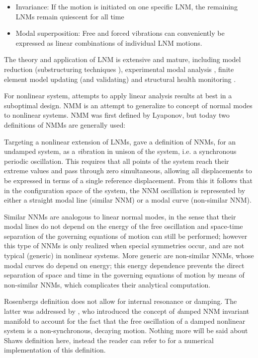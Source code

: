 \begin{itemize}
\item Invariance: If the motion is initiated on one specific LNM, the remaining
  LNMs remain quiescent for all time
\item Modal superposition: Free and forced vibrations can conveniently be
  expressed as linear combinations of individual LNM motions.
\end{itemize}

The theory and application of LNM is extensive and mature, including model
reduction (substructuring techniques \citep{craig1968a}), experimental modal
analysis \citep{ewins2000a}, finite element model updating (and
validating)\citep{friswell1995a} and structural health monitoring
\citet{doebling1996damage}.



For nonlinear system, attempts to apply linear analysis results at best in a
suboptimal design. NMM is an attempt to generalize to concept of normal modes to
nonlinear systems. NMM was first defined by Lyaponov, but today two definitions
of NMMs are generally used:

Targeting a nonlinear extension of LNMs, \citep{rosenberg1966a} gave a
definition of NNMs, for an undamped system, as a {\textit vibration in unison of the
  system}, i.e. a synchronous periodic oscillation. This requires that all
points of the system reach their extreme values and pass through zero
simultaneous, allowing all displacements to be expressed in terms of a single
reference displacement.
From this it follows that in the configuration space of the system, the NNM
oscillation is represented by either a straight modal line (similar NNM) or a
modal curve (non-similar NNM).

Similar NNMs are analogous to linear normal modes, in the sense that their modal
lines do not depend on the energy of the free oscillation and space-time
separation of the governing equations of motion can still be performed; however
this type of NNMs is only realized when special symmetries occur, and are not
typical (generic) in nonlinear systems. More generic are non-similar NNMs, whose
modal curves do depend on energy; this energy dependence prevents the direct
separation of space and time in the governing equations of motion by means of
non-similar NNMs, which complicates their analytical computation.


Rosenbergs definition does not allow for internal resonance or damping.  The
latter was addressed by \citep{shaw1993a}, who introduced the concept of {\textit
  damped NNM invariant manifold} to account for the fact that the free
oscillation of a damped nonlinear system is a non-synchronous, decaying motion.
Nothing more will be said about Shaws definition here, instead the reader can
refer to \citep{renson2014_phd} for a numerical implementation of this
definition.

